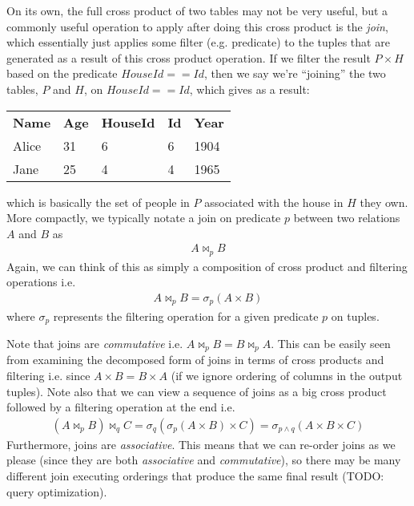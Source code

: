 \documentclass[10pt,a4paper]{article}
\begin{document}
On its own, the full cross product of two tables may not be very useful, but a commonly useful operation to apply after doing this cross product is the \textit{join}, which essentially just applies some filter (e.g. predicate) to the tuples that are generated as a result of this cross product operation. If we filter the result $P \times H$ based on the predicate $HouseId == Id$, then we say we're ``joining'' the two tables, $P$ and $H$, on $HouseId == Id$, which gives as a result:
\begin{center}
    \begin{tabular}{| l | l | l | l | l |}
        \textbf{Name} & \textbf{Age}& \textbf{HouseId} & \textbf{Id} & \textbf{Year} \\
        Alice & 31 & 6 & 6 & 1904\\  
        Jane & 25 & 4 & 4 & 1965   
\end{tabular}
\end{center}
which is basically the set of people in $P$ associated with the house in $H$ they own. More compactly, we typically notate a join on predicate $p$ between two relations $A$ and $B$ as
\begin{align*}
    A \Join_p B
\end{align*}
Again, we can think of this as simply a composition of cross product and filtering operations i.e.
\begin{align*}
    A \Join_p B = \sigma_p(A \times B)
\end{align*}
where $\sigma_p$ represents the filtering operation for a given predicate $p$ on tuples.

Note that joins are \textit{commutative} i.e. $A \Join_p B = B \Join_p A$. This can be easily seen from examining the decomposed form of joins in terms of cross products and filtering i.e. since $A \times B = B \times A$ (if we ignore ordering of columns in the output tuples). Note also that we can view a sequence of joins as a big cross product followed by a filtering operation at the end i.e.
\begin{align*}
    (A \Join_p B) \Join_q C = \sigma_q(\sigma_p(A \times B) \times C) = \sigma_{p \wedge q}(A \times B \times C)
\end{align*}
Furthermore, joins are \textit{associative}. This means that we can re-order joins as we please (since they are both \textit{associative} and \textit{commutative}), so there may be many different join executing orderings that produce the same final result (TODO: query optimization).
\end{document}
